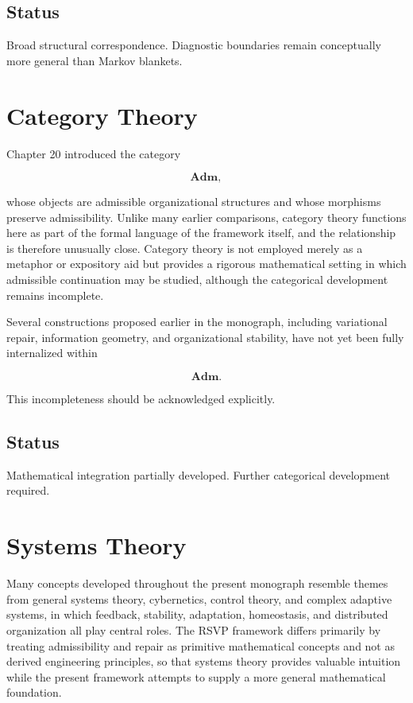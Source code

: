 \documentclass[11pt,oneside]{book}
\numberwithin{equation}{chapter}
\theoremstyle{definition}
\theoremstyle{plain}
\begin{document}
\subsection*{Status}

Broad structural correspondence. Diagnostic boundaries remain conceptually
more general than Markov blankets.

\section{Category Theory}

Chapter 20 introduced the category

\[
\mathbf{Adm},
\]

whose objects are admissible organizational structures and whose morphisms preserve admissibility. Unlike many earlier comparisons, category theory functions here as part of the formal language of the framework itself, and the relationship is therefore unusually close. Category theory is not employed merely as a metaphor or expository aid but provides a rigorous mathematical setting in which admissible continuation may be studied, although the categorical development remains incomplete.

Several constructions proposed earlier in the monograph, including
variational repair, information geometry, and organizational stability,
have not yet been fully internalized within

\[
\mathbf{Adm}.
\]

This incompleteness should be acknowledged explicitly.

\subsection*{Status}

Mathematical integration partially developed. Further categorical
development required.

\section{Systems Theory}

Many concepts developed throughout the present monograph resemble themes from general systems theory, cybernetics, control theory, and complex adaptive systems, in which feedback, stability, adaptation, homeostasis, and distributed organization all play central roles. The RSVP framework differs primarily by treating admissibility and repair as primitive mathematical concepts and not as derived engineering principles, so that systems theory provides valuable intuition while the present framework attempts to supply a more general mathematical foundation.
\end{document}
